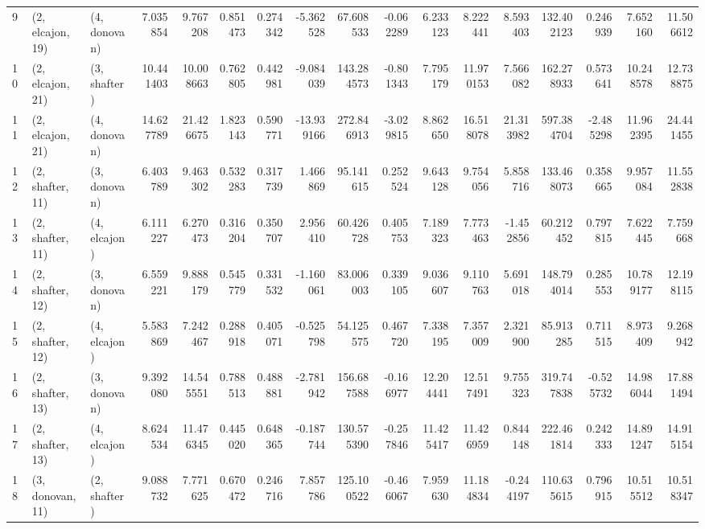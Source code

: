 \begin{tabular}{lllrrrrrrrrrrrrrr}
9  &  (2, elcajon, 19) &     (4, donovan) &   7.035854 &   9.767208 &   0.851473 &  0.274342 &  -5.362528 &   67.608533 & -0.062289 &   6.233123 &   8.222441 &   8.593403 &   132.402123 &  0.246939 &   7.652160 &  11.506612 \\
10 &  (2, elcajon, 21) &     (3, shafter) &  10.441403 &  10.008663 &   0.762805 &  0.442981 &  -9.084039 &  143.284573 & -0.801343 &   7.795179 &  11.970153 &   7.566082 &   162.278933 &  0.573641 &  10.248578 &  12.738875 \\
11 &  (2, elcajon, 21) &     (4, donovan) &  14.627789 &  21.426675 &   1.823143 &  0.590771 & -13.939166 &  272.846913 & -3.029815 &   8.862650 &  16.518078 &  21.313982 &   597.384704 & -2.485298 &  11.962395 &  24.441455 \\
12 &  (2, shafter, 11) &     (3, donovan) &   6.403789 &   9.463302 &   0.532283 &  0.317739 &   1.466869 &   95.141615 &  0.252524 &   9.643128 &   9.754056 &   5.858716 &   133.468073 &  0.358665 &   9.957084 &  11.552838 \\
13 &  (2, shafter, 11) &     (4, elcajon) &   6.111227 &   6.270473 &   0.316204 &  0.350707 &   2.956410 &   60.426728 &  0.405753 &   7.189323 &   7.773463 &  -1.452856 &    60.212452 &  0.797815 &   7.622445 &   7.759668 \\
14 &  (2, shafter, 12) &     (3, donovan) &   6.559221 &   9.888179 &   0.545779 &  0.331532 &  -1.160061 &   83.006003 &  0.339105 &   9.036607 &   9.110763 &   5.691018 &   148.794014 &  0.285553 &  10.789177 &  12.198115 \\
15 &  (2, shafter, 12) &     (4, elcajon) &   5.583869 &   7.242467 &   0.288918 &  0.405071 &  -0.525798 &   54.125575 &  0.467720 &   7.338195 &   7.357009 &   2.321900 &    85.913285 &  0.711515 &   8.973409 &   9.268942 \\
16 &  (2, shafter, 13) &     (3, donovan) &   9.392080 &  14.545551 &   0.788513 &  0.488881 &  -2.781942 &  156.687588 & -0.166977 &  12.204441 &  12.517491 &   9.755323 &   319.747838 & -0.525732 &  14.986044 &  17.881494 \\
17 &  (2, shafter, 13) &     (4, elcajon) &   8.624534 &  11.476345 &   0.445020 &  0.648365 &  -0.187744 &  130.575390 & -0.257846 &  11.425417 &  11.426959 &   0.844148 &   222.461814 &  0.242333 &  14.891247 &  14.915154 \\
18 &  (3, donovan, 11) &     (2, shafter) &   9.088732 &   7.771625 &   0.670472 &  0.246716 &   7.857786 &  125.100522 & -0.466067 &   7.959630 &  11.184834 &  -0.244197 &   110.635615 &  0.796915 &  10.515512 &  10.518347 \\

\end{tabular}
